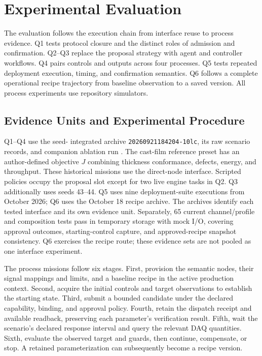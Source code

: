 \section{Experimental Evaluation}
\label{sec:eval}
The evaluation follows the execution chain from interface reuse to process
evidence. Q1 tests protocol closure and the distinct roles of admission and
confirmation. Q2--Q3 replace the proposal strategy with agent and controller
workflows. Q4 pairs controls and outputs across four processes. Q5 tests
repeated deployment execution, timing, and confirmation semantics. Q6
follows a complete operational recipe trajectory from baseline observation
to a saved version. All process experiments use repository simulators.

\subsection{Evidence Units and Experimental Procedure}
\label{sec:testbed}
\label{sec:procedure}
Q1--Q4 use the seed-\resSeed{} integrated archive
\texttt{20260921184204-10lc}, its raw scenario records, and companion ablation
run \resAblationRun. The cast-film reference preset has an author-defined
objective $J$ combining thickness conformance, defects, energy, and
throughput. These historical missions use the direct-node interface.
Scripted policies occupy the proposal slot except for two live engine
tasks in Q2. Q3 additionally uses seeds 43--44. Q5 uses nine
deployment-suite executions from October 2026; Q6 uses the October 18 recipe
archive. The archives identify each tested interface and its own evidence
unit. Separately, 65 current channel/profile and composition tests pass in
temporary storage with mock I/O, covering approval outcomes, starting-control
capture, and approved-recipe snapshot consistency. Q6 exercises the recipe
route; these evidence sets are not pooled as one interface experiment.

The process missions follow six stages. First, provision the semantic nodes,
their signal mappings and limits, and a baseline recipe in the active
production context. Second, acquire the initial controls and target
observations to establish the starting state. Third, submit a bounded
candidate under the declared capability, binding, and approval policy.
Fourth, retain the dispatch receipt and available readback, preserving each
parameter's verification result. Fifth, wait the scenario's declared
response interval and query the relevant DAQ quantities. Sixth, evaluate
the observed target and guards, then continue, compensate, or stop. A
retained parameterization can subsequently become a recipe version.

